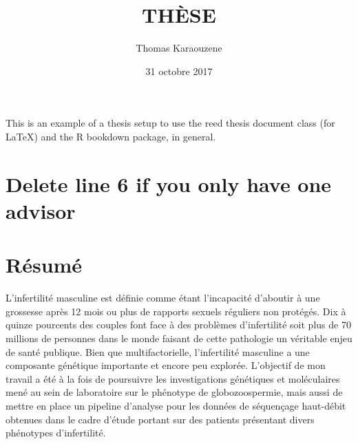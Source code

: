 \documentclass[12pt,twoside]{reedthesis}
\title{THÈSE}
\author{Thomas Karaouzene}
\date{31 octobre 2017}
\theoremstyle{definition}
\theoremstyle{definition}
\theoremstyle{remark}
\begin{document}
      \maketitle
  
  \frontmatter %
  \pagestyle{empty} %

  
      \begin{preface}
      This is an example of a thesis setup to use the reed thesis document
      class (for LaTeX) and the R bookdown package, in general.
    \end{preface}
  
      \hypersetup{linkcolor=black}
    \setcounter{tocdepth}{3}
    \tableofcontents
  
      \listoftables
  
      \listoffigures
  
  
  
  \mainmatter %
  \pagestyle{fancyplain} %

  \chapter{Delete line 6 if you only have one
  advisor}\label{delete-line-6-if-you-only-have-one-advisor}
  
  \chapter*{Résumé}\label{resume}
  
  \newpage
  
  L'infertilité masculine est définie comme étant l'incapacité d'aboutir à
  une grossesse après 12 mois ou plus de rapports sexuels réguliers non
  protégés. Dix à quinze pourcents des couples font face à des problèmes
  d'infertilité soit plus de 70 millions de personnes dans le monde
  faisant de cette pathologie un véritable enjeu de santé publique. Bien
  que multifactorielle, l'infertilité masculine a une composante génétique
  importante et encore peu explorée. L'objectif de mon travail a été à la
  fois de poursuivre les investigations génétiques et moléculaires mené au
  sein de laboratoire sur le phénotype de globozoospermie, mais aussi de
  mettre en place un pipeline d'analyse pour les données de séquençage
  haut-débit obtenues dans le cadre d'étude portant sur des patients
  présentant divers phénotypes d'infertilité.
  
\end{document}
